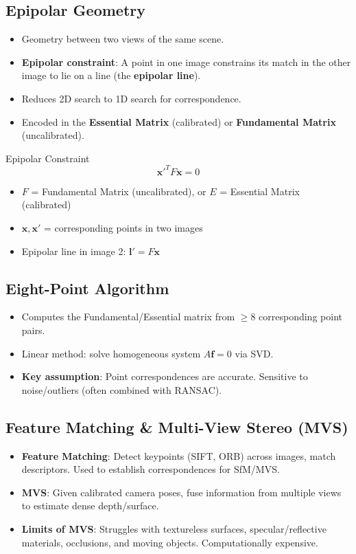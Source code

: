 \documentclass[11pt]{article}
\begin{document}
\subsection{Epipolar Geometry}
\begin{itemize}
    \item Geometry between two views of the same scene.
    \item \textbf{Epipolar constraint}: A point in one image constrains its match in the other image to lie on a line (the \textbf{epipolar line}).
    \item Reduces 2D search to 1D search for correspondence.
    \item Encoded in the \textbf{Essential Matrix} (calibrated) or \textbf{Fundamental Matrix} (uncalibrated).
\end{itemize}

\begin{formulabox}{Epipolar Constraint}
$$\mathbf{x}'^T F \mathbf{x} = 0$$
\begin{itemize}
    \item $F$ = Fundamental Matrix (uncalibrated), or $E$ = Essential Matrix (calibrated)
    \item $\mathbf{x}, \mathbf{x}'$ = corresponding points in two images
    \item Epipolar line in image 2: $\mathbf{l}' = F \mathbf{x}$
\end{itemize}
\end{formulabox}

\subsection{Eight-Point Algorithm}
\begin{itemize}
    \item Computes the Fundamental/Essential matrix from $\geq 8$ corresponding point pairs.
    \item Linear method: solve homogeneous system $A\mathbf{f} = 0$ via SVD.
    \item \textbf{Key assumption}: Point correspondences are accurate. Sensitive to noise/outliers (often combined with RANSAC).
\end{itemize}

\subsection{Feature Matching \& Multi-View Stereo (MVS)}
\begin{itemize}
    \item \textbf{Feature Matching}: Detect keypoints (SIFT, ORB) across images, match descriptors. Used to establish correspondences for SfM/MVS.
    \item \textbf{MVS}: Given calibrated camera poses, fuse information from multiple views to estimate dense depth/surface.
    \item \textbf{Limits of MVS}: Struggles with textureless surfaces, specular/reflective materials, occlusions, and moving objects. Computationally expensive.
\end{itemize}
\end{document}
